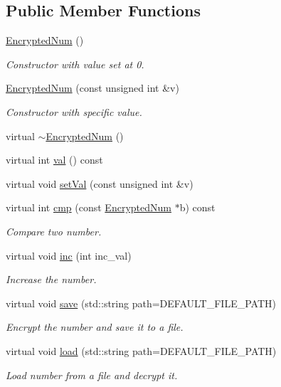 \subsection*{Public Member Functions}
\begin{DoxyCompactItemize}
\item 
\mbox{\hyperlink{class_encrypted_num_ab53b1c8adf7c2b2770f00e88fe98f270}{Encrypted\+Num}} ()
\begin{DoxyCompactList}\small\item\em Constructor with value set at 0. \end{DoxyCompactList}\item 
\mbox{\hyperlink{class_encrypted_num_aeb560ce38d13963932a5247917d2bb7b}{Encrypted\+Num}} (const unsigned int \&v)
\begin{DoxyCompactList}\small\item\em Constructor with specific value. \end{DoxyCompactList}\item 
virtual \mbox{\hyperlink{class_encrypted_num_a795b635aeef60427532e1a8f26db8cdd}{$\sim$\+Encrypted\+Num}} ()
\item 
virtual int \mbox{\hyperlink{class_encrypted_num_a3cb78d22a4bbb6bd3199bcf10de04366}{val}} () const
\item 
virtual void \mbox{\hyperlink{class_encrypted_num_a4469ba057a691e6edacc25022596d1fa}{set\+Val}} (const unsigned int \&v)
\item 
virtual int \mbox{\hyperlink{class_encrypted_num_aec63be923f5ce470e63b78c9e70704b5}{cmp}} (const \mbox{\hyperlink{class_encrypted_num}{Encrypted\+Num}} $\ast$b) const
\begin{DoxyCompactList}\small\item\em Compare two number. \end{DoxyCompactList}\item 
virtual void \mbox{\hyperlink{class_encrypted_num_a838b2db3fc304aca318d0bc22a906c52}{inc}} (int inc\+\_\+val)
\begin{DoxyCompactList}\small\item\em Increase the number. \end{DoxyCompactList}\item 
virtual void \mbox{\hyperlink{class_encrypted_num_a33cddaaa96d51dbe29f0f99278c287dc}{save}} (std\+::string path=D\+E\+F\+A\+U\+L\+T\+\_\+\+F\+I\+L\+E\+\_\+\+P\+A\+TH)
\begin{DoxyCompactList}\small\item\em Encrypt the number and save it to a file. \end{DoxyCompactList}\item 
virtual void \mbox{\hyperlink{class_encrypted_num_adb5f15f13ecd4fd79511164c42448433}{load}} (std\+::string path=D\+E\+F\+A\+U\+L\+T\+\_\+\+F\+I\+L\+E\+\_\+\+P\+A\+TH)
\begin{DoxyCompactList}\small\item\em Load number from a file and decrypt it. \end{DoxyCompactList}\end{DoxyCompactItemize}


